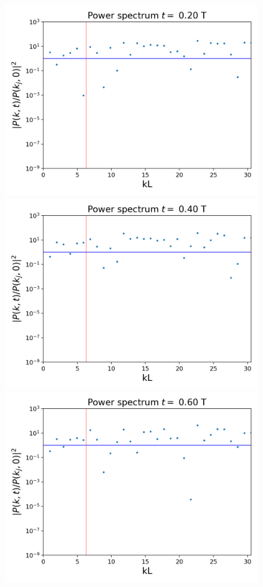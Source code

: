 \documentclass[notitlepage,letterpaper,12pt]{article} %
\begin{document}
\begin{figure}[H]
  \centering
   \includegraphics[scale= 0.5]{1powerSeries8.png}
   \includegraphics[scale= 0.5]{1powerSeries16.png}
   \includegraphics[scale= 0.5]{1powerSeries24.png}

\end{figure}
\end{document}
